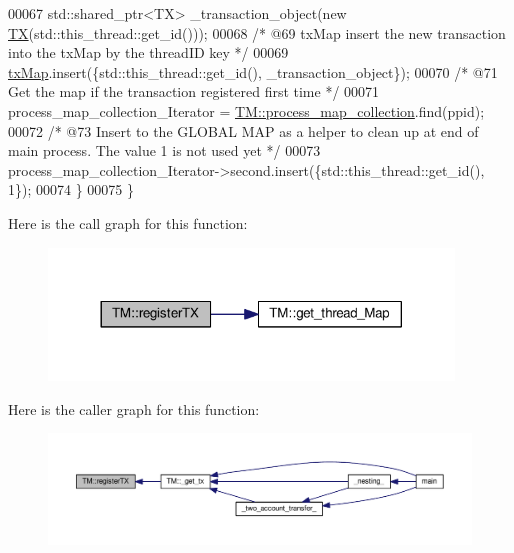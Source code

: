 \begin{DoxyCode}
00067         std::shared\_ptr<TX> \_transaction\_object(\textcolor{keyword}{new} \hyperlink{class_t_x}{TX}(std::this\_thread::get\_id()));
00068         \textcolor{comment}{/* @69 txMap insert the new transaction into the txMap by the threadID key */}
00069         \hyperlink{class_t_m_a0333dfa193ea99d7626de74a2b932e9b_a0333dfa193ea99d7626de74a2b932e9b}{txMap}.insert(\{std::this\_thread::get\_id(), \_transaction\_object\});
00070         \textcolor{comment}{/* @71 Get the map if the transaction registered first time */}
00071         process\_map\_collection\_Iterator = \hyperlink{class_t_m_a6d417b18213968da2a70a914e80d639b_a6d417b18213968da2a70a914e80d639b}{TM::process\_map\_collection}.find(ppid);
00072         \textcolor{comment}{/* @73 Insert to the GLOBAL MAP as a helper to clean up at end of main process. The value 1 is not
       used yet */}
00073         process\_map\_collection\_Iterator->second.insert(\{std::this\_thread::get\_id(), 1\});
00074     \}
00075 \}
\end{DoxyCode}


Here is the call graph for this function\+:\nopagebreak
\begin{figure}[H]
\begin{center}
\leavevmode
\includegraphics[width=305pt]{class_t_m_a26ea481c24d9aa3aebd6dafb7253376e_a26ea481c24d9aa3aebd6dafb7253376e_cgraph}
\end{center}
\end{figure}




Here is the caller graph for this function\+:\nopagebreak
\begin{figure}[H]
\begin{center}
\leavevmode
\includegraphics[width=350pt]{class_t_m_a26ea481c24d9aa3aebd6dafb7253376e_a26ea481c24d9aa3aebd6dafb7253376e_icgraph}
\end{center}
\end{figure}




